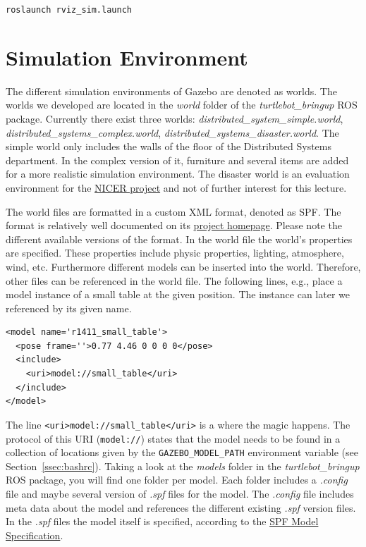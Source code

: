 \verb$roslaunch rviz_sim.launch$

\section{Simulation Environment}
\label{sec:SimulationEnvironment}

The different simulation environments of Gazebo are denoted as worlds. The worlds we developed are located in the \emph{world} folder of the \emph{turtlebot\_bringup} ROS package. Currently there exist three worlds: \emph{distributed\_system\_simple.world}, \emph{distributed\_sys\-tems\_com\-plex.world}, \emph{distributed\_systems\_disaster.world}. The simple world only includes the walls of the floor of the Distributed Systems department. In the complex version of it, furniture and several items are added for a more realistic simulation environment. The disaster world is an evaluation environment for the \href{http://www.uni-kassel.de/eecs/fachgebiete/vs/research/nicer.html}{NICER project} and not of further interest for this lecture. 

The world files are formatted in a custom XML format, denoted as SPF. The format is relatively well documented on its \href{http://sdformat.org}{project homepage}. Please note the different available versions of the format. In the world file the world's properties are specified. These properties include physic properties, lighting, atmosphere, wind, etc. Furthermore different models can be inserted into the world. Therefore, other files can be referenced in the world file. The following lines, e.g., place a model instance of a small table at the given position. The instance can later we referenced by its given name.

\begin{Verbatim}[fontsize=\small]
<model name='r1411_small_table'>
  <pose frame=''>0.77 4.46 0 0 0 0</pose>
  <include>
    <uri>model://small_table</uri>
  </include>
</model>
\end{Verbatim}

The line \verb$<uri>model://small_table</uri>$ is a where the magic happens. The protocol of this URI (\verb$model://$) states that the model needs to be found in a collection of locations given by the \verb$GAZEBO_MODEL_PATH$ environment variable (see Section~\ref{ssec:bashrc}). Taking a look at the \emph{models} folder in the \emph{turtlebot\_bringup} ROS package, you will find one folder per model. Each folder includes a \emph{.config} file and maybe several version of \emph{.spf} files for the model. The \emph{.config} file includes meta data about the model and references the different existing \emph{.spf} version files. In the \emph{.spf} files the model itself is specified, according to the \href{http://sdformat.org/spec?ver=1.6&elem=model}{SPF Model Specification}.

